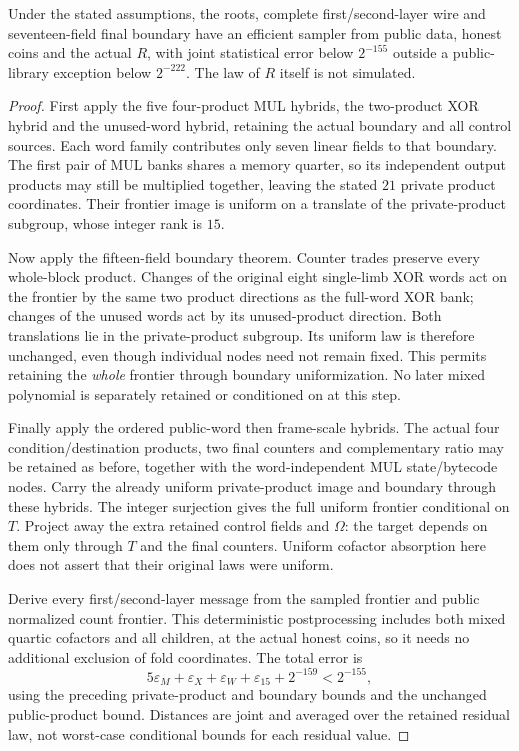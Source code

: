 \begin{proposition}
Under the stated assumptions, the roots, complete first/second-layer wire and seventeen-field final boundary have an efficient sampler from public data, honest coins and the actual $R$, with joint statistical error below $2^{-155}$ outside a public-library exception below $2^{-222}$. The law of $R$ itself is not simulated.
\end{proposition}
\begin{proof}
First apply the five four-product MUL hybrids, the two-product XOR hybrid and the unused-word hybrid, retaining the actual boundary and all control sources. Each word family contributes only seven linear fields to that boundary. The first pair of MUL banks shares a memory quarter, so its independent output products may still be multiplied together, leaving the stated $21$ private product coordinates. Their frontier image is uniform on a translate of the private-product subgroup, whose integer rank is $15$.

Now apply the fifteen-field boundary theorem. Counter trades preserve every whole-block product. Changes of the original eight single-limb XOR words act on the frontier by the same two product directions as the full-word XOR bank; changes of the unused words act by its unused-product direction. Both translations lie in the private-product subgroup. Its uniform law is therefore unchanged, even though individual nodes need not remain fixed. This permits retaining the \emph{whole} frontier through boundary uniformization. No later mixed polynomial is separately retained or conditioned on at this step.

Finally apply the ordered public-word then frame-scale hybrids. The actual four condition/destination products, two final counters and complementary ratio may be retained as before, together with the word-independent MUL state/bytecode nodes. Carry the already uniform private-product image and boundary through these hybrids. The integer surjection gives the full uniform frontier conditional on $T$. Project away the extra retained control fields and $\Omega$: the target depends on them only through $T$ and the final counters. Uniform cofactor absorption here does not assert that their original laws were uniform.

Derive every first/second-layer message from the sampled frontier and public normalized count frontier. This deterministic postprocessing includes both mixed quartic cofactors and all children, at the actual honest coins, so it needs no additional exclusion of fold coordinates. The total error is
\[
 5\varepsilon_M+\varepsilon_X+\varepsilon_W+\varepsilon_{15}
      +2^{-159}<2^{-155},
\]
using the preceding private-product and boundary bounds and the unchanged public-product bound. Distances are joint and averaged over the retained residual law, not worst-case conditional bounds for each residual value.
\end{proof}

